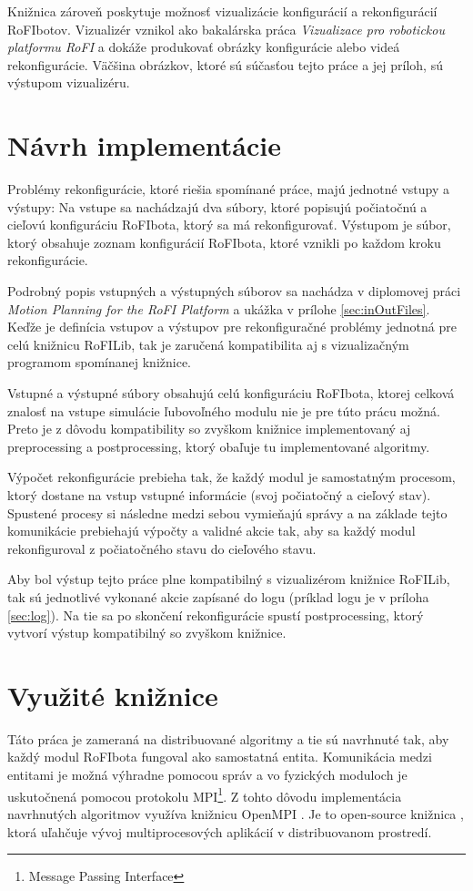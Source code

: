 \documentclass[
  digital, %
  oneside, %
  notable,   %
  lof,     %
  nolot,     %
]{fithesis3}
\begin{document}
Knižnica zároveň poskytuje možnosť vizualizácie konfigurácií a rekonfigurácií RoFIbotov. Vizualizér vznikol ako bakalárska práca \textit{Vizualizace pro robotickou platformu RoFI} \cite{nausovaBachelorThesis} a dokáže produkovať obrázky konfigurácie alebo videá rekonfigurácie. Väčšina obrázkov, ktoré sú súčasťou tejto práce a jej príloh, sú výstupom vizualizéru. 

\section{Návrh implementácie}
Problémy rekonfigurácie, ktoré riešia spomínané práce, majú jednotné vstupy a výstupy: Na vstupe sa nachádzajú dva súbory, ktoré popisujú počiatočnú a cieľovú konfiguráciu RoFIbota, ktorý sa má rekonfigurovať. Výstupom je súbor, ktorý obsahuje zoznam konfigurácií RoFIbota, ktoré vznikli po každom kroku rekonfigurácie. 

Podrobný popis vstupných a výstupných súborov sa nachádza v diplomovej práci \textit{Motion Planning for the RoFI Platform} \cite{vozarovaMasterThesis} a ukážka v prílohe \ref{sec:inOutFiles}. Keďže je definícia vstupov a výstupov pre rekonfiguračné problémy jednotná pre celú knižnicu RoFILib, tak je zaručená kompatibilita aj s vizualizačným programom spomínanej knižnice. 

Vstupné a výstupné súbory obsahujú celú konfiguráciu RoFIbota, ktorej celková znalosť na vstupe simulácie ľubovoľného modulu nie je pre túto prácu možná. Preto je z dôvodu kompatibility so zvyškom knižnice implementovaný aj preprocessing a postprocessing, ktorý obaľuje tu implementované algoritmy. 

Výpočet rekonfigurácie prebieha tak, že každý modul je samostatným procesom, ktorý dostane na vstup vstupné informácie (svoj počiatočný a cieľový stav). Spustené procesy si následne medzi sebou vymieňajú správy a na základe tejto komunikácie prebiehajú výpočty a validné akcie tak, aby sa každý modul rekonfiguroval z počiatočného stavu do cieľového stavu. 

Aby bol výstup tejto práce plne kompatibilný s vizualizérom knižnice RoFILib, tak sú jednotlivé vykonané akcie zapísané do logu (príklad logu je v príloha \ref{sec:log}). Na tie sa po skončení rekonfigurácie spustí postprocessing, ktorý vytvorí výstup kompatibilný so zvyškom knižnice. 

\section{Využité knižnice}
\label{sec:libraries}
Táto práca je zameraná na distribuované algoritmy a tie sú navrhnuté tak, aby každý modul RoFIbota fungoval ako samostatná entita. Komunikácia medzi entitami je možná výhradne pomocou správ a vo fyzických moduloch je uskutočnená pomocou protokolu MPI\footnote{Message Passing Interface}. Z tohto dôvodu implementácia navrhnutých algoritmov využíva knižnicu OpenMPI \cite{openMPILibrary}. Je to open-source knižnica \cite{openMPIGit}, ktorá uľahčuje vývoj multiprocesových aplikácií v distribuovanom prostredí. 
\end{document}
